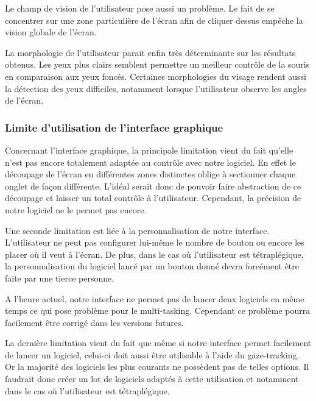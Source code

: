 Le champ de vision de l’utilisateur pose aussi un problème. Le fait de se concentrer sur une zone particulière de l’écran afin de cliquer dessus empêche la vision globale de l’écran.

La morphologie de l’utilisateur parait enfin très déterminante sur les résultats obtenus. Les yeux plus clairs semblent permettre un meilleur contrôle de la souris en comparaison aux yeux foncés. Certaines morphologies du visage rendent aussi la détection des yeux difficiles, notamment lorsque l’utilisateur observe les angles de l’écran.

\subsubsection{Limite d’utilisation de l’interface graphique}

Concernant l’interface graphique, la principale limitation vient du fait qu’elle n’est pas encore totalement adaptée au contrôle avec notre logiciel. En effet le découpage de l’écran en différentes zones distinctes oblige à sectionner chaque onglet de façon différente. L’idéal serait donc de pouvoir faire abstraction de ce découpage et laisser un total contrôle à l’utilisateur. Cependant, la précision de notre logiciel ne le permet pas encore.

Une seconde limitation est liée à la personnalisation de notre interface. L’utilisateur ne peut pas configurer lui-même le nombre de bouton ou encore les placer où il veut à l’écran. De plus, dans le cas où l’utilisateur est tétraplégique, la personnalisation du logiciel lancé par un bouton donné devra forcément être faite par une tierce personne.

A l’heure actuel, notre interface ne permet pas de lancer deux logiciels en même temps ce qui pose problème pour le multi-tasking. Cependant ce problème pourra facilement être corrigé dans les versions futures.

La dernière limitation vient du fait que même si notre interface permet facilement de lancer un logiciel, celui-ci doit aussi être utilisable à l’aide du gaze-tracking. Or la majorité des logiciels les plus courants ne possèdent pas de telles options. Il faudrait donc créer un lot de logiciels adaptés à cette utilisation et notamment dans le cas où l’utilisateur est tétraplégique.